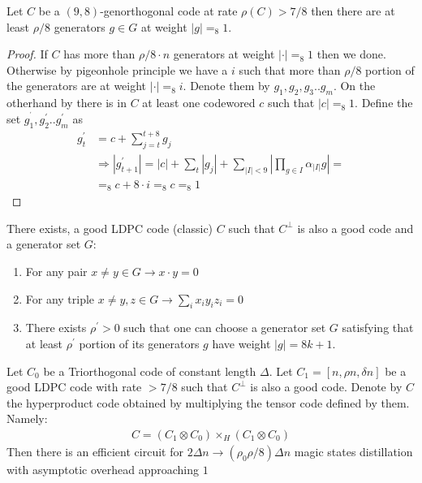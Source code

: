 \documentclass[manuscript,screen,review]{acmart}
\begin{document}
\begin{claim}
  Let $C$ be a $(9,8)$-genorthogonal code at rate $\rho(C) > 7/8 $ then there are at least $\rho/8$ generators $g \in G$ at weight $|g| =_{8} 1$.
\end{claim}
\begin{proof}
  If $C$ has more than $\rho/8 \cdot n$ generators at weight $| \cdot | =_{8} 1$ then we done. Otherwise by pigeonhole principle we have a $i$ such that more than $\rho/8$ portion of the generators are at weight $ |\cdot| =_{8} i$. Denote them by $g_{1},g_{2},g_{3}..g_{m}$. On the otherhand by  there is in $C$ at least one codewored $c$ such that $|c| =_{8} 1$. Define the set $g_{1}^{^\prime},g_{2}^{\prime}..g_{m}^{\prime}$ as   
  \begin{equation*}
    \begin{split}
      g^{\prime}_{t} & = c + \sum_{j=t}^{t+8}g_{j} \\
      & \Rightarrow |g^{\prime}_{t+1}| = |c| + \sum_{t}{ |g_{j}| } + \sum_{|I|<9}|\prod_{g \in I} \alpha_{|I|} g | =\\
      & =_{8} c + 8\cdot i =_{8} c =_{8} 1  
    \end{split}
  \end{equation*} 
\end{proof}

\begin{claim}
  There exists, a good LDPC code (classic) $C$ such that $C^{\perp}$ is also a good code and a generator set $G$:  
  \begin{enumerate}
    \item For any pair $x \neq y \in G \rightarrow x\cdot y = 0$
    \item For any triple $x\neq y,z \in G \rightarrow \sum_{i}x_{i}y_{i}z_{i} = 0$
    \item  There exists $\rho^{\prime} > 0$ such that one can choose a generator set $G$ satisfying that at least $\rho^{\prime}$ portion of its generators $g$ have weight $|g| = 8k + 1$.
  \end{enumerate}
\end{claim}


\begin{claim} 
Let $C_0$ be a Triorthogonal code of constant length $\Delta$. Let $C_1 = [n, \rho n, \delta n]$ be a good LDPC code with rate $>7/8$ such that $C^{\perp}$ is also a good code. Denote by $C$ the hyperproduct code obtained by multiplying the tensor code defined by them. Namely:
  \begin{equation*}
    \begin{split}
      C = \left( C_{1} \otimes C_{0} \right) \times_{H} \left( C_{1} \otimes C_{0} \right)
    \end{split}
  \end{equation*} 
Then there is an efficient circuit for $2\Delta n \rightarrow (\rho_{0}\rho/8) \Delta n$ magic states distillation with asymptotic overhead approaching $1$ 
\end{claim}
\end{document}
